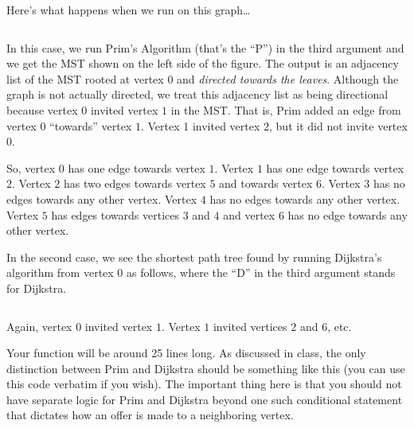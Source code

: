\documentclass{ks-pset}
\begin{document}
\begin{problem}[\Py{PrimDijkstra}, 65]
\begin{description}
\begin{description}
\begin{aside}
\begin{center}
              \label{figure:results}
            \end{center}
          \end{aside}

          Here's what happens when we run  on this graph…

          \inputminted{python}{template/02-pd1-p.py}

          In this case, we run Prim's Algorithm (that's the ``P'') in the third
          argument and we get the MST shown on the left side of the figure. The
          output is an adjacency list of the MST rooted at vertex \(0\) and
          \emph{directed towards the leaves}.  Although the graph is not
          actually directed, we treat this adjacency list as being directional
          because vertex \(0\) invited vertex \(1\) in the MST. That is, Prim
          added an edge from vertex \(0\) ``towards'' vertex \(1\).  Vertex 1
          invited vertex \(2\), but it did not invite vertex \(0\).

          So, vertex \(0\) has one edge towards vertex \(1\). Vertex \(1\) has
          one edge towards vertex \(2\). Vertex \(2\) has two edges towards
          vertex \(5\) and towards vertex \(6\). Vertex \(3\) has no edges
          towards any other vertex. Vertex \(4\) has no edges towards any other
          vertex. Vertex \(5\) has edges towards vertices \(3\) and \(4\) and
          vertex \(6\) has no edge towards any other vertex.

          In the second case, we see the shortest path tree found by running
          Dijkstra's algorithm from vertex \(0\) as follows, where the ``D'' in
          the third argument stands for Dijkstra.

          \inputminted{python}{template/02-pd1-d.py}
        
          Again, vertex \(0\) invited vertex \(1\). Vertex \(1\) invited
          vertices \(2\) and \(6\), etc.

          \begin{note}
            Your  function will be around 25 lines long. As
            discussed in class, the only distinction between Prim and Dijkstra
            should be something like this (you can use this code verbatim if
            you wish).  The important thing here is that you should not have
            separate logic for Prim and Dijkstra beyond one such conditional
            statement that dictates how an offer is made to a neighboring
            vertex.


\end{note}
\end{description}
\end{description}
\end{problem}
\end{document}

